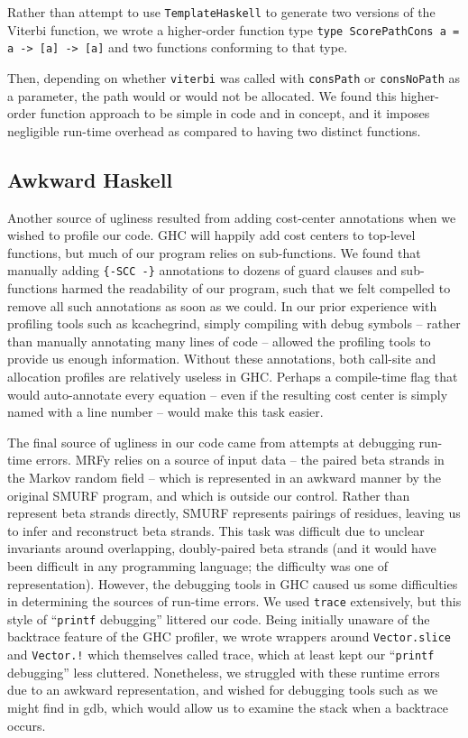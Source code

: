 \documentclass[preprint,nonatbib,blockstyle,nocopyrightspace,times]{sigplanconf}
\begin{document}
Rather than attempt to use \texttt{TemplateHaskell} to generate two versions of 
the Viterbi function, we wrote a higher-order function type 
\lstinline!type ScorePathCons a = a -> [a] -> [a]! and two functions conforming to that type.

Then, depending on whether \texttt{viterbi} was called with \texttt{consPath} 
or \texttt{consNoPath} as a parameter, the path would or would not be 
allocated.
We found this higher-order function approach to be simple in code 
and in concept, and it imposes negligible run-time overhead as compared to 
having two distinct functions.



\subsection{Awkward Haskell}

Another source of ugliness resulted from adding cost-center annotations when we 
wished to profile our code.
GHC will happily add cost centers to top-level 
functions, but much of our program relies on sub-functions.
We found that 
manually adding \texttt{\{-SCC -\}} annotations to dozens of guard clauses and 
sub-functions harmed the readability of our program, such that we felt 
compelled to remove all such annotations as soon as we could.
In our prior 
experience with profiling tools such as kcachegrind, simply compiling with 
debug symbols -- rather than manually annotating many lines of code -- allowed 
the profiling tools to provide us enough information.
Without these 
annotations, both call-site and allocation profiles are relatively useless in 
GHC.
Perhaps a compile-time flag that would auto-annotate every equation -- 
even if the resulting cost center is simply named with a line number -- would 
make this task easier.

The final source of ugliness in our code came from attempts at debugging 
run-time errors.
MRFy relies on a source of input data -- the paired beta 
strands in the Markov random field -- which is represented in an awkward manner 
by the original SMURF program, and which is outside our control.
Rather than 
represent beta strands directly, SMURF represents pairings of residues, leaving 
us to infer and reconstruct beta strands.
This task was difficult due to 
unclear invariants around overlapping, doubly-paired beta strands (and it would 
have been difficult in any programming language; the difficulty was one of 
representation).
However, the debugging tools in GHC caused us some 
difficulties in determining the sources of run-time errors.
We used 
\texttt{trace} extensively, but this style of ``\texttt{printf} debugging'' 
littered our code.
Being initially unaware of the backtrace feature of the GHC 
profiler, we wrote wrappers around \texttt{Vector.slice} and \texttt{Vector.!} 
which themselves called trace, which at least kept our ``\texttt{printf} 
debugging'' less cluttered.
Nonetheless, we struggled with these runtime errors 
due to an awkward representation, and wished for debugging tools such as we 
might find in gdb, which would allow us to examine the stack when a backtrace 
occurs.
 
\end{document}
